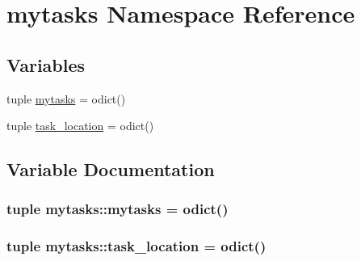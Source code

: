 \hypertarget{namespacemytasks}{\section{mytasks \-Namespace \-Reference}
\label{namespacemytasks}
}
\subsection*{\-Variables}
\begin{DoxyCompactItemize}
\item 
tuple \hyperlink{namespacemytasks_a919c161fb1ecb1ce1869b7cbc560a397}{mytasks} = odict()
\item 
tuple \hyperlink{namespacemytasks_a32a13c56c8062cb61c648ff1d2debc66}{task\-\_\-location} = odict()
\end{DoxyCompactItemize}


\subsection{\-Variable \-Documentation}
\hypertarget{namespacemytasks_a919c161fb1ecb1ce1869b7cbc560a397}{
\subsubsection[{mytasks}]{\setlength{\rightskip}{0pt plus 5cm}tuple {\bf mytasks\-::mytasks} = odict()}}\label{namespacemytasks_a919c161fb1ecb1ce1869b7cbc560a397}
\hypertarget{namespacemytasks_a32a13c56c8062cb61c648ff1d2debc66}{
\subsubsection[{task\-\_\-location}]{\setlength{\rightskip}{0pt plus 5cm}tuple {\bf mytasks\-::task\-\_\-location} = odict()}}\label{namespacemytasks_a32a13c56c8062cb61c648ff1d2debc66}
